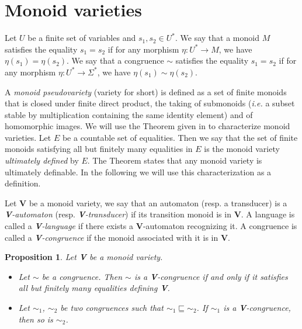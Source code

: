 \documentclass[12pt]{report}
\newtheorem{prp}{Proposition}[section]
\theoremstyle{definition}
\theoremstyle{remark}
\begin{document}
\section{Monoid varieties}
Let $U$ be a finite set of variables and $s_1,s_2\in U^\ast$.
We say that a monoid $M$ satisfies the equality $s_1=s_2$ if for any morphism $\eta:U^\ast\rightarrow M$, we have $\eta(s_1)=\eta(s_2)$.
We say that a congruence $\sim$ satisfies the equality $s_1=s_2$ if for any morphism $\eta:U^\ast\rightarrow\Sigma^\ast$, we have $\eta(s_1)\sim \eta(s_2)$.

A \emph{monoid pseudovariety} (variety for short) is defined \cite{straubing96} as a set of finite monoids that is closed under finite direct product, the taking of submonoids (\emph{i.e.} a subset stable by multiplication containing the same identity element) and of homomorphic images.
We will use the Theorem given in \cite{eilenbergs76} to characterize monoid varieties.
Let $E$ be a countable set of equalities.
Then we say that the set of finite monoids satisfying all but finitely many equalities in $E$ is the monoid variety \emph{ultimately defined} by $E$.
The Theorem states that any monoid variety is ultimately definable.
In the following we will use this characterization as a definition.

Let \textbf V be a monoid variety, we say that an automaton (resp. a transducer) is a \emph{\textbf V-automaton} (resp. \emph{\textbf V-transducer}) if its transition monoid is in \textbf V.
A language is called a \emph{\textbf V-language} if there exists a \textbf V-automaton recognizing it.
A congruence is called a \emph{\textbf V-congruence} if the monoid associated with it is in \textbf V.

\begin{prp}
\label{v-congruence}
Let \textbf V be a monoid variety.
\begin{itemize}
\item Let $\sim$ be a congruence. Then $\sim$ is a \textbf V-congruence if and only if it satisfies all but finitely many equalities defining \textbf V.

\item Let $\sim_1$, $\sim_2$ be two congruences such that $\sim_1\sqsubseteq \sim_2$. If $\sim_1$ is a \textbf V-congruence, then so is $\sim_2$.

\end{itemize}
\end{prp}
\end{document}
